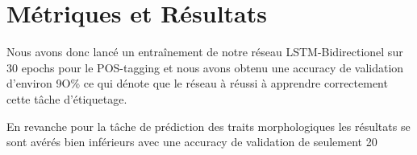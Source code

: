 \documentclass[a4paper]{article}
\begin{document}
\section{Métriques et Résultats}


Nous avons donc lancé un entraînement de notre réseau LSTM-Bidirectionel sur 30 epochs pour le POS-tagging et nous avons obtenu une accuracy de validation d'environ 9O\% ce qui dénote que le réseau à réussi à apprendre correctement cette tâche d'étiquetage.


En revanche pour la tâche de prédiction des traits morphologiques les résultats se sont avérés bien inférieurs avec une accuracy de validation de seulement 20%
\end{document}
